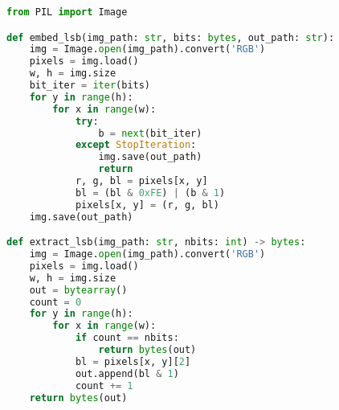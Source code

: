 \documentclass[../main.tex]{subfiles}
\begin{document}
\begin{lstlisting}[language=Python, caption={LSB sederhana}, label={lst:lsb}]
from PIL import Image

def embed_lsb(img_path: str, bits: bytes, out_path: str):
    img = Image.open(img_path).convert('RGB')
    pixels = img.load()
    w, h = img.size
    bit_iter = iter(bits)
    for y in range(h):
        for x in range(w):
            try:
                b = next(bit_iter)
            except StopIteration:
                img.save(out_path)
                return
            r, g, bl = pixels[x, y]
            bl = (bl & 0xFE) | (b & 1)
            pixels[x, y] = (r, g, bl)
    img.save(out_path)

def extract_lsb(img_path: str, nbits: int) -> bytes:
    img = Image.open(img_path).convert('RGB')
    pixels = img.load()
    w, h = img.size
    out = bytearray()
    count = 0
    for y in range(h):
        for x in range(w):
            if count == nbits:
                return bytes(out)
            bl = pixels[x, y][2]
            out.append(bl & 1)
            count += 1
    return bytes(out)
\end{lstlisting}
\end{document}
